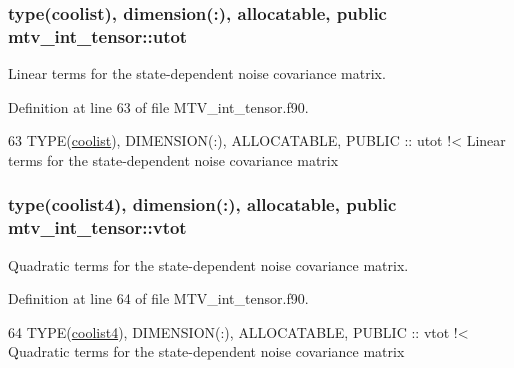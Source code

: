 \subsubsection[{\texorpdfstring{utot}{utot}}]{\setlength{\rightskip}{0pt plus 5cm}type({\bf coolist}), dimension(\+:), allocatable, public mtv\+\_\+int\+\_\+tensor\+::utot}\hypertarget{namespacemtv__int__tensor_a4a2acf9c88ba182967568ecfdd2eae0a}{}\label{namespacemtv__int__tensor_a4a2acf9c88ba182967568ecfdd2eae0a}


Linear terms for the state-\/dependent noise covariance matrix. 



Definition at line 63 of file M\+T\+V\+\_\+int\+\_\+tensor.\+f90.


\begin{DoxyCode}
63   \textcolor{keywordtype}{TYPE}(\hyperlink{structtensor_1_1coolist}{coolist}), \textcolor{keywordtype}{DIMENSION(:)}, \textcolor{keywordtype}{ALLOCATABLE}, \textcolor{keywordtype}{PUBLIC} :: utot\textcolor{comment}{ !< Linear terms for the state-dependent
       noise covariance matrix}
\end{DoxyCode}
\subsubsection[{\texorpdfstring{vtot}{vtot}}]{\setlength{\rightskip}{0pt plus 5cm}type({\bf coolist4}), dimension(\+:), allocatable, public mtv\+\_\+int\+\_\+tensor\+::vtot}\hypertarget{namespacemtv__int__tensor_a35e35414488bc119d9604ada011cc842}{}\label{namespacemtv__int__tensor_a35e35414488bc119d9604ada011cc842}


Quadratic terms for the state-\/dependent noise covariance matrix. 



Definition at line 64 of file M\+T\+V\+\_\+int\+\_\+tensor.\+f90.


\begin{DoxyCode}
64   \textcolor{keywordtype}{TYPE}(\hyperlink{structtensor_1_1coolist4}{coolist4}), \textcolor{keywordtype}{DIMENSION(:)}, \textcolor{keywordtype}{ALLOCATABLE}, \textcolor{keywordtype}{PUBLIC} :: vtot\textcolor{comment}{ !< Quadratic terms for the
       state-dependent noise covariance matrix}
\end{DoxyCode}

